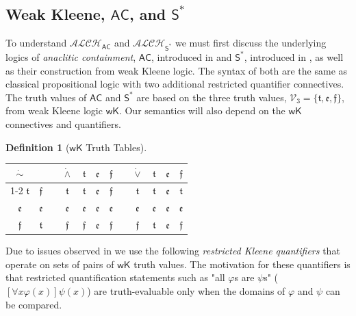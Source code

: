 \documentclass[letterpaper]{article} %
\theoremstyle{definition}
\theoremstyle{definition}
\newtheorem{definition}{Definition}
\theoremstyle{definition}
\theoremstyle{definition}
\theoremstyle{definition}
\newcommand{\strongneg}{\mathord{\sim}}
\newcommand{\vt}{\mathfrak{t}}
\newcommand{\vf}{\mathfrak{f}}
\newcommand{\vu}{\mathfrak{e}}
\begin{document}
\subsection{Weak Kleene, $\mathsf{AC}$, and $\mathsf{S}^*$}
To understand $\mathcal{ALCH}_\mathsf{AC}$ and $\mathcal{ALCH}_{\mathsf{S}^*}$ we must first discuss the underlying logics of \textit{anaclitic containment}, $\mathsf{AC}$, introduced in \cite{Angell1977-ANGTSO-9} and $\mathsf{S}^*$, introduced in \cite{Daniels1990-DANANO-3}, as well as their construction from weak Kleene logic. The syntax of both are the same as classical propositional logic with two additional restricted quantifier connectives. The truth values of $\mathsf{AC}$ and $\mathsf{S}^*$ are based on the three truth values, $\mathcal{V}_3 = \{\vt, \vu, \vf\}$, from weak Kleene logic $\mathsf{wK}$. Our semantics will also depend on the $\mathsf{wK}$ connectives and quantifiers.  
\begin{definition}[$\mathsf{wK}$ Truth Tables]
\leavevmode\par\noindent
\begin{tabular}{c|c c c|ccc c c|ccc}
    $\dot{\strongneg}$ & && $\dot{\wedge}$ & $\vt$ & $\vu$ & $\vf$ && $\dot{\vee}$ & $\vt$ & $\vu$ & $\vf$\\
    \cline{1-2}\cline{4-7}\cline{9-12}
    $\vt$ & $\vf$ && $\vt$ & $\vt$ & $\vu$ & $\vf$ && $\vt$ & $\vt$ & $\vu$ & $\vt$\\
    $\vu$ & $\vu$ && $\vu$ & $\vu$ & $\vu$ & $\vu$ && $\vu$ & $\vu$ & $\vu$ & $\vu$\\
    $\vf$ & $\vt$ && $\vf$ & $\vf$ & $\vu$ & $\vf$ && $\vf$ & $\vt$ & $\vu$ & $\vf$\\
\end{tabular}
\end{definition}
\noindent Due to issues observed in \cite{DBLP:conf/tableaux/Ferguson21,DBLP:conf/dlog/Ferguson21} we use the following \textit{restricted Kleene quantifiers} that operate on sets of pairs of $\mathsf{wK}$ truth values. The motivation for these quantifiers is that restricted quantification statements such as "all $\varphi$s are $\psi$s" ($[\forall x\varphi(x)]\psi(x)$) are truth-evaluable only when the domains of $\varphi$ and $\psi$ can be compared.
\end{document}
